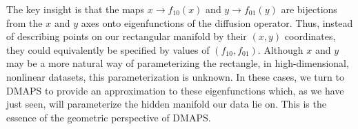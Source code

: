 The key insight is that the maps $x \rightarrow f_{10} (x)$ and
$y \rightarrow f_{01} (y)$ are bijections from the $x$ and $y$ axes
onto eigenfunctions of the diffusion operator. Thus, instead of
describing points on our rectangular manifold by their $(x,y)$
coordinates, they could equivalently be specified by values of
$(f_{10}, f_{01})$. Although $x$ and $y$ may be a more natural way of
parameterizing the rectangle, in high-dimensional, nonlinear datasets,
this parameterization is unknown. In these cases, we turn to DMAPS to
provide an approximation to these eigenfunctions which, as we have
just seen, will parameterize the hidden manifold our data lie on. This
is the essence of the geometric perspective of DMAPS.








